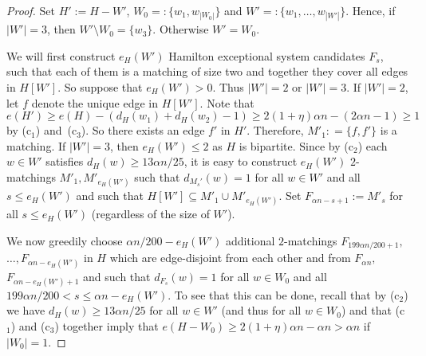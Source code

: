\documentclass{memo-l}
\numberwithin{section}{chapter}
\numberwithin{equation}{section}
\numberwithin{firstthm}{section}
\numberwithin{figure}{section}
\begin{document}
{\begin{proof}
Set $H':=H - W'$, $W_0 =: \{w_1, w_{|W_0|} \}$ and $W' =: \{ w_1, \dots, w_{|W'|} \}$.
Hence, if $|W'| = 3$, then $W' \setminus W_0 = \{ w_3 \}$. Otherwise $W'=W_0$.

We will first construct $e_{H}(W')$ Hamilton exceptional system candidates $F_s$, such that each of them is a matching
of size two and together they cover all edges in $H[W']$. So suppose that $e_{H}(W')>0$. Thus $|W'| =2$ or $|W'| = 3$. 
If $|W'| = 2$, let $f$ denote the unique edge in $H[W']$. Note that
$$e(H')  \ge e(H) - (d_H(w_1) + d_H(w_2) -1) \ge 2(1+\eta)\alpha n-(2\alpha n-1)\ge 1$$
by (c$_1$) and~(c$_3$). So there exists an edge $f'$ in $H'$. Therefore, $M'_1 : = \{f,f'\}$ is a matching.
If $|W'| = 3$, then $e_{H}(W') \le 2$ as $H$ is bipartite. Since by (c$_2$) each $w \in W'$ satisfies $d_H(w) \ge 13\alpha n / 25$, it
is easy to construct $e_H(W')$ $2$-matchings $M'_1,M'_{e_{H}(W')}$ such that $d_{M_s'}(w) = 1$ for all $w \in W'$ and all $s \le e_H(W')$
and such that $H[W'] \subseteq M'_1 \cup M'_{e_{H}(W')}$. Set $F_{ \alpha  n - s+1} := M'_s$ for all $s \le e_H(W')$ (regardless of the size of $W'$).

We now greedily choose $\alpha n/200-e_{H}(W')$ additional $2$-matchings $F_{199\alpha n/200+1},$ $\dots,F_{ \alpha n - e_{H}(W')}$ in $H$ which are
edge-disjoint from each other and from $F_{ \alpha n },$\\ $F_{ \alpha n - e_{H}(W') +1}$ and such that $d_{F_s}(w)=1$
for all $w\in W_0$ and all $199\alpha n/200<s\le  \alpha n - e_{H}(W')$. To see that this can be done, recall that by (c$_2$) we have
$d_H(w)\ge 13 \alpha n / 25$ for all $w\in W'$ (and thus for all $w\in W_0$) and that (c$_1$) and (c$_3$) together imply that
$e(H-W_0)\ge 2(1+ \eta)\alpha n-\alpha n>\alpha n$ if $|W_0|=1$.


\end{proof}}
\end{document}

